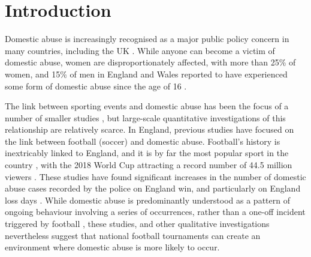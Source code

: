 \documentclass[12pt, a4paper]{article}
\begin{document}
\newpage
\RaggedRight
\section{Introduction}

Domestic abuse is increasingly recognised as a major public policy concern in many countries, including the UK \cite{ep}. While anyone can become a victim of domestic abuse, women are disproportionately affected, with more than 25\% of women, and 15\% of men in England and Wales reported to have experienced some form of domestic abuse since the age of 16 \cite{ONS}.

The link between sporting events and domestic abuse has been the focus of a number of smaller studies \cite{Williams2014}, but large-scale quantitative investigations of this relationship are relatively scarce. In England, previous studies have focused on the link between football (soccer) and domestic abuse. Football's history is inextricably linked to England, and it is by far the most popular sport in the country \cite{Parry2014}, with the 2018 World Cup attracting a record number of 44.5 million viewers \cite{BBC}. These studies have found significant increases in the number of domestic abuse cases recorded by the police on England win, and particularly on England loss days \cite{Brimicombe2012, Kirby2014}. While domestic abuse is predominantly understood as a pattern of ongoing behaviour involving a series of occurrences, rather than a one-off incident triggered by football \cite{Brooks-Hay2018}, these studies, and other qualitative investigations \cite{Swallow} nevertheless suggest that national football tournaments can create an environment where domestic abuse is more likely to occur.


\end{document}
